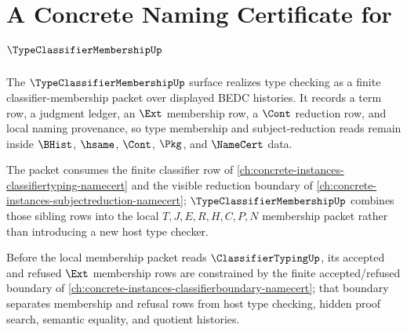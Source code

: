 \chapter{A Concrete Naming Certificate for $\TypeClassifierMembershipUp$}
\label{ch:concrete-instances-typeclassifiermembership-namecert}

The $\TypeClassifierMembershipUp$ surface realizes type checking as a finite classifier-membership packet over displayed BEDC histories. It records a term row, a judgment ledger, an $\Ext$ membership row, a $\Cont$ reduction row, and local naming provenance, so type membership and subject-reduction reads remain inside $\BHist$, $\hsame$, $\Cont$, $\Pkg$, and $\NameCert$ data.

The packet consumes the finite classifier row of \autoref{ch:concrete-instances-classifiertyping-namecert} and the visible reduction boundary of \autoref{ch:concrete-instances-subjectreduction-namecert}; $\TypeClassifierMembershipUp$ combines those sibling rows into the local $T,J,E,R,H,C,P,N$ membership packet rather than introducing a new host type checker.

Before the local membership packet reads $\ClassifierTypingUp$, its accepted and refused $\Ext$ membership rows are constrained by the finite accepted/refused boundary of \autoref{ch:concrete-instances-classifierboundary-namecert}; that boundary separates membership and refusal rows from host type checking, hidden proof search, semantic equality, and quotient histories.

